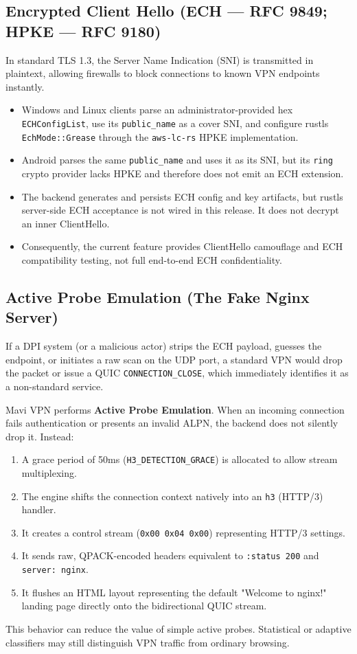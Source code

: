 \documentclass[11pt,a4paper]{article}
\begin{document}
\subsection{Encrypted Client Hello (ECH --- RFC 9849; HPKE --- RFC 9180)}
In standard TLS 1.3, the Server Name Indication (SNI) is transmitted in plaintext, allowing firewalls to block connections to known VPN endpoints instantly.
\begin{itemize}
    \item Windows and Linux clients parse an administrator-provided hex \texttt{ECHConfigList}, use its \texttt{public\_name} as a cover SNI, and configure rustls \texttt{EchMode::Grease} through the \texttt{aws-lc-rs} HPKE implementation.
    \item Android parses the same \texttt{public\_name} and uses it as its SNI, but its \texttt{ring} crypto provider lacks HPKE and therefore does not emit an ECH extension.
    \item The backend generates and persists ECH config and key artifacts, but rustls server-side ECH acceptance is not wired in this release. It does not decrypt an inner ClientHello.
    \item Consequently, the current feature provides ClientHello camouflage and ECH compatibility testing, not full end-to-end ECH confidentiality.
\end{itemize}

\subsection{Active Probe Emulation (The Fake Nginx Server)}
If a DPI system (or a malicious actor) strips the ECH payload, guesses the endpoint, or initiates a raw scan on the UDP port, a standard VPN would drop the packet or issue a QUIC \texttt{CONNECTION\_CLOSE}, which immediately identifies it as a non-standard service.

Mavi VPN performs \textbf{Active Probe Emulation}. When an incoming connection fails authentication or presents an invalid ALPN, the backend does not silently drop it. Instead:
\begin{enumerate}
    \item A grace period of 50ms (\texttt{H3\_DETECTION\_GRACE}) is allocated to allow stream multiplexing.
    \item The engine shifts the connection context natively into an \texttt{h3} (HTTP/3) handler.
    \item It creates a control stream (\texttt{0x00 0x04 0x00}) representing HTTP/3 settings.
    \item It sends raw, QPACK-encoded headers equivalent to \texttt{:status 200} and \texttt{server: nginx}.
    \item It flushes an HTML layout representing the default "Welcome to nginx!" landing page directly onto the bidirectional QUIC stream.
\end{enumerate}
This behavior can reduce the value of simple active probes. Statistical or adaptive classifiers may still distinguish VPN traffic from ordinary browsing.
\end{document}
